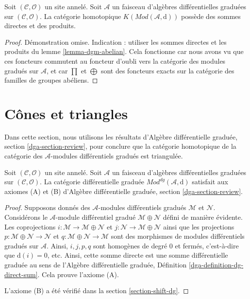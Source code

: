 \begin{lemma}
\label{lemma-homotopy-direct-sums}
Soit $(\mathcal{C}, \mathcal{O})$ un site annelé.
Soit $\mathcal{A}$ un faisceau d'algèbres différentielles graduées sur $(\mathcal{C}, \mathcal{O})$.
La catégorie homotopique $K(\textit{Mod}(\mathcal{A}, \text{d}))$ possède des sommes directes et des produits.
\end{lemma}

\begin{proof}
Démonstration omise.
Indication : utiliser les sommes directes et les produits du lemme \ref{lemma-dgm-abelian}.
Cela fonctionne car nous avons vu que ces foncteurs commutent au foncteur d'oubli vers la catégorie des modules gradués sur $\mathcal{A}$, et car $\prod$ et $\bigoplus$ sont des foncteurs exacts sur la catégorie des familles de groupes abéliens.
\end{proof}










\section{Cônes et triangles}
\label{section-conclude-triangulated}

\noindent
Dans cette section, nous utilisons les résultats d'Algèbre différentielle graduée, section \ref{dga-section-review}, pour conclure que la catégorie homotopique de la catégorie des $\mathcal{A}$-modules différentiels gradués est triangulée.

\begin{lemma}
\label{lemma-axioms-AB}
Soit $(\mathcal{C}, \mathcal{O})$ un site annelé.
Soit $\mathcal{A}$ un faisceau d'algèbres différentielles graduées sur $(\mathcal{C}, \mathcal{O})$.
La catégorie différentielle graduée $\textit{Mod}^{dg}(\mathcal{A}, \text{d})$ satisfait aux axiomes (A) et (B) d'Algèbre différentielle graduée, section \ref{dga-section-review}.
\end{lemma}

\begin{proof}
Supposons donnés des $\mathcal{A}$-modules différentiels gradués $\mathcal{M}$ et $\mathcal{N}$.
Considérons le $\mathcal{A}$-module différentiel gradué $\mathcal{M} \oplus \mathcal{N}$ défini de manière évidente.
Les coprojections $i : \mathcal{M} \to \mathcal{M} \oplus \mathcal{N}$ et $j : \mathcal{N} \to \mathcal{M} \oplus \mathcal{N}$ ainsi que les projections $p : \mathcal{M} \oplus \mathcal{N} \to \mathcal{N}$ et $q : \mathcal{M} \oplus \mathcal{N} \to \mathcal{M}$ sont des morphismes de modules différentiels gradués sur $\mathcal{A}$.
Ainsi, $i, j, p, q$ sont homogènes de degré $0$ et fermés, c'est-à-dire que $\text{d}(i) = 0$, etc.
Ainsi, cette somme directe est une somme différentielle graduée au sens de l'Algèbre différentielle graduée, Définition \ref{dga-definition-dg-direct-sum}.
Cela prouve l'axiome (A).

\medskip\noindent
L'axiome (B) a été vérifié dans la section \ref{section-shift-dg}.
\end{proof}

